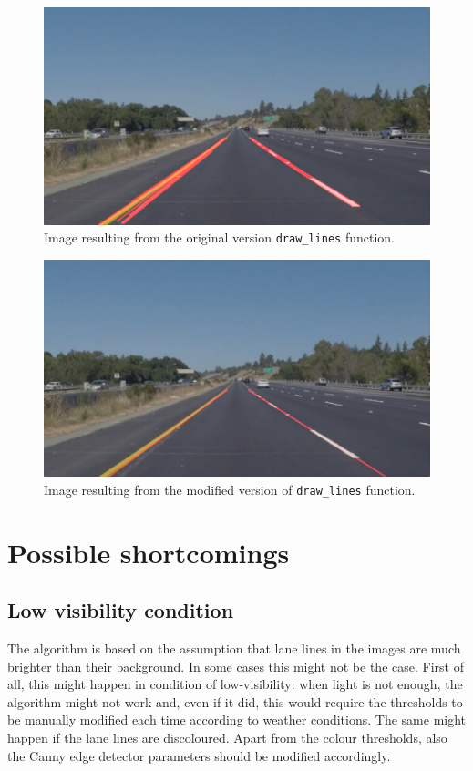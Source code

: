 \documentclass{article}
\let\cd\lstinline
\begin{document}
\begin{figure}
\centering
\includegraphics[scale=0.4]{test_images_output_raw/solidYellowLeft.jpg}
\caption{Image resulting from the original version \cd+draw_lines+ function.}
\label{fig:5}
\end{figure}

\begin{figure}
\centering
\includegraphics[scale=0.4]{test_images_output/solidYellowLeft.jpg}
\caption{Image resulting from the modified version of \cd+draw_lines+ function.}
\label{fig:6}
\end{figure}

\section{Possible shortcomings}
\subsection{Low visibility condition}
The algorithm is based on the assumption that lane lines in the images are much brighter than their background. In some cases this might not be the case. First of all, this might happen in condition of low-visibility: when light is not enough, the algorithm might not work and, even if it did, this would require the thresholds to be manually modified each time according to weather conditions. The same might happen if the lane lines are discoloured. Apart from the colour thresholds, also the Canny edge detector parameters should be modified accordingly.
\end{document}
